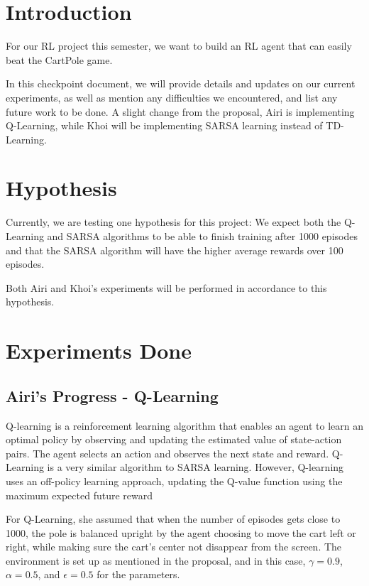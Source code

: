 \documentclass[nohyperref]{article}
\theoremstyle{plain}
\theoremstyle{definition}
\theoremstyle{remark}
\begin{document}

\section{Introduction}

For our RL project this semester, we want to build an RL agent that can easily beat the CartPole game.  

In this checkpoint document, we will provide details and updates on our current experiments, as well as mention any difficulties we encountered, and list any future work to be done. A slight change from the proposal, Airi is implementing Q-Learning, while Khoi will be implementing SARSA learning instead of TD-Learning.

\section{Hypothesis}

Currently, we are testing one hypothesis for this project: We expect both the Q-Learning and SARSA algorithms to be able to finish training after 1000 episodes and that the SARSA algorithm will have the 
higher average rewards over 100 episodes.

Both Airi and Khoi's experiments will be performed in accordance to this hypothesis.

\section{Experiments Done}

\subsection{Airi's Progress - Q-Learning}
Q-learning is a reinforcement learning algorithm that enables an agent to learn an optimal policy by observing and updating the estimated value of state-action pairs. 
The agent selects an action and observes the next state and reward.
Q-Learning is a very similar algorithm to SARSA learning. However, Q-learning uses an off-policy learning approach, updating the Q-value function using the maximum expected future reward

For Q-Learning, she assumed that when the number of episodes gets close to 1000, the pole is balanced upright by the agent choosing to move the cart left or right, while making sure the cart's center not disappear from the screen. 
The environment is set up as mentioned in the proposal, and in this case, $\gamma = 0.9$, $\alpha = 0.5$, and $\epsilon = 0.5$ for the parameters.  
\end{document}
